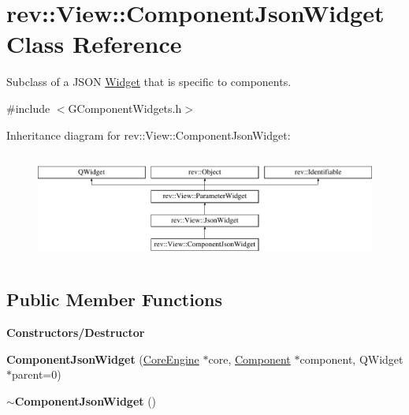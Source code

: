 \hypertarget{classrev_1_1_view_1_1_component_json_widget}{}\section{rev\+::View\+::Component\+Json\+Widget Class Reference}
\label{classrev_1_1_view_1_1_component_json_widget}


Subclass of a J\+S\+ON \mbox{\hyperlink{class_widget}{Widget}} that is specific to components.  




{\ttfamily \#include $<$G\+Component\+Widgets.\+h$>$}

Inheritance diagram for rev\+::View\+::Component\+Json\+Widget\+:\begin{figure}[H]
\begin{center}
\leavevmode
\includegraphics[height=3.607085cm]{classrev_1_1_view_1_1_component_json_widget}
\end{center}
\end{figure}
\subsection*{Public Member Functions}
\begin{Indent}\textbf{ Constructors/\+Destructor}\par
\begin{DoxyCompactItemize}
\item 
\mbox{\label{classrev_1_1_view_1_1_component_json_widget_a7132fe81e034e720a6c71c28130437e5}} 
{\bfseries Component\+Json\+Widget} (\mbox{\hyperlink{classrev_1_1_core_engine}{Core\+Engine}} $\ast$core, \mbox{\hyperlink{classrev_1_1_component}{Component}} $\ast$component, Q\+Widget $\ast$parent=0)
\item 
\mbox{\label{classrev_1_1_view_1_1_component_json_widget_ac4bedfc10b171ed956c2ca72567cf875}} 
{\bfseries $\sim$\+Component\+Json\+Widget} ()
\end{DoxyCompactItemize}
\end{Indent}
